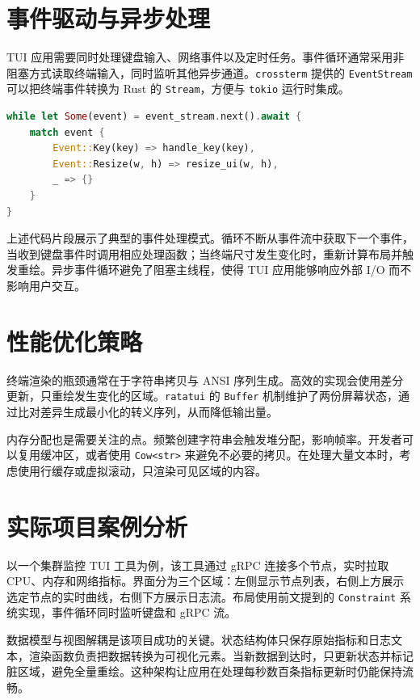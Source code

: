 \chapter{事件驱动与异步处理}
TUI 应用需要同时处理键盘输入、网络事件以及定时任务。事件循环通常采用非阻塞方式读取终端输入，同时监听其他异步通道。\texttt{crossterm} 提供的 \texttt{EventStream} 可以把终端事件转换为 Rust 的 \texttt{Stream}，方便与 \texttt{tokio} 运行时集成。\par
\begin{lstlisting}[language=rust]
while let Some(event) = event_stream.next().await {
    match event {
        Event::Key(key) => handle_key(key),
        Event::Resize(w, h) => resize_ui(w, h),
        _ => {}
    }
}
\end{lstlisting}
上述代码片段展示了典型的事件处理模式。循环不断从事件流中获取下一个事件，当收到键盘事件时调用相应处理函数；当终端尺寸发生变化时，重新计算布局并触发重绘。异步事件循环避免了阻塞主线程，使得 TUI 应用能够响应外部 I/O 而不影响用户交互。\par
\chapter{性能优化策略}
终端渲染的瓶颈通常在于字符串拷贝与 ANSI 序列生成。高效的实现会使用差分更新，只重绘发生变化的区域。\texttt{ratatui} 的 \texttt{Buffer} 机制维护了两份屏幕状态，通过比对差异生成最小化的转义序列，从而降低输出量。\par
内存分配也是需要关注的点。频繁创建字符串会触发堆分配，影响帧率。开发者可以复用缓冲区，或者使用 \texttt{Cow<str>} 来避免不必要的拷贝。在处理大量文本时，考虑使用行缓存或虚拟滚动，只渲染可见区域的内容。\par
\chapter{实际项目案例分析}
以一个集群监控 TUI 工具为例，该工具通过 gRPC 连接多个节点，实时拉取 CPU、内存和网络指标。界面分为三个区域：左侧显示节点列表，右侧上方展示选定节点的实时曲线，右侧下方展示日志流。布局使用前文提到的 \texttt{Constraint} 系统实现，事件循环同时监听键盘和 gRPC 流。\par
数据模型与视图解耦是该项目成功的关键。状态结构体只保存原始指标和日志文本，渲染函数负责把数据转换为可视化元素。当新数据到达时，只更新状态并标记脏区域，避免全量重绘。这种架构让应用在处理每秒数百条指标更新时仍能保持流畅。\par

